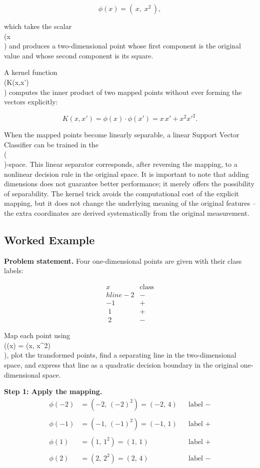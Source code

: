 \documentclass[12pt, a4paper]{article}
\begin{document}
\[
\phi(x) = (\,x,\;x^{2}\,),
\]

which takes the scalar \\(x\\) and produces a two-dimensional point whose first component is the original value and whose second component is its square.  

A kernel function \\(K(x,x')\\) computes the inner product of two mapped points without ever forming the vectors explicitly:

\[
K(x,x') = \phi(x) \cdot \phi(x') = x\,x' + x^{2}{x'}^{2}.
\]

When the mapped points become linearly separable, a linear Support Vector Classifier can be trained in the \\(\phi\\)-space. This linear separator corresponds, after reversing the mapping, to a nonlinear decision rule in the original space. It is important to note that adding dimensions does not guarantee better performance; it merely offers the possibility of separability. The kernel trick avoids the computational cost of the explicit mapping, but it does not change the underlying meaning of the original features -- the extra coordinates are derived systematically from the original measurement.

\subsection{Worked Example}
\textbf{Problem statement.}  
Four one-dimensional points are given with their class labels:

\[
\begin{array}{c|c}
x & \text{class} \\hline
-2 & - \\
-1 & + \\
\;1 & + \\
\;2 & -
\end{array}
\]

Map each point using \\(\phi(x) = (x, x^{2})\\), plot the transformed points, find a separating line in the two-dimensional space, and express that line as a quadratic decision boundary in the original one-dimensional space.

\textbf{Step 1: Apply the mapping.}  
\[
\begin{aligned}
\phi(-2) &= (-2,\,(-2)^{2}) = (-2,\,4) &&\text{label } - \\\\
\phi(-1) &= (-1,\,(-1)^{2}) = (-1,\,1) &&\text{label } + \\\\
\phi(1)  &= (1,\,1^{2})   = (1,\,1)  &&\text{label } + \\\\
\phi(2)  &= (2,\,2^{2})   = (2,\,4)  &&\text{label } -
\end{aligned}
\]
\end{document}
